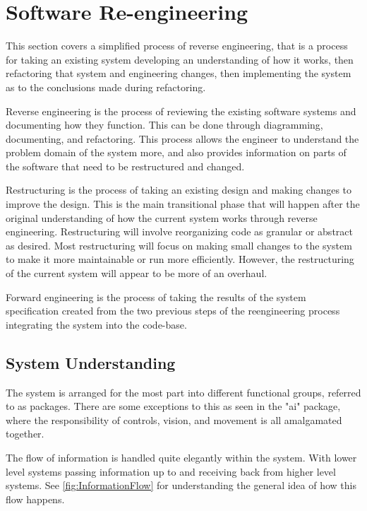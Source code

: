 \chapter{Software Re-engineering}

\label{Chapter3}

This section covers a simplified process of reverse engineering, that is a process for taking an existing system developing an understanding of how it works, then refactoring that system and engineering changes, then implementing the system as to the conclusions made during refactoring.

Reverse engineering is the process of reviewing the existing software systems and documenting how they function. This can be done through diagramming, documenting, and refactoring. This process allows the engineer to understand the problem domain of the system more, and also provides information on parts of the software that need to be restructured and changed.

Restructuring is the process of taking an existing design and making changes to improve the design. This is the main transitional phase that will happen after the original understanding of how the current system works through reverse engineering. Restructuring will involve reorganizing code as granular or abstract as desired. Most restructuring will focus on making small changes to the system to make it more maintainable or run more efficiently. However, the restructuring of the current system will appear to be more of an overhaul.

Forward engineering is the process of taking the results of the system specification created from the two previous steps of the reengineering process integrating the system into the code-base.

\section{System Understanding}

The system is arranged for the most part into different functional groups, referred to as packages. There are some exceptions to this as seen in the "ai" package, where the responsibility of controls, vision, and movement is all amalgamated together.

The flow of information is handled quite elegantly within the system.
With lower level systems passing information up to and receiving back from
higher level systems. See \ref{fig:InformationFlow} for understanding the
general idea of how this flow happens.

